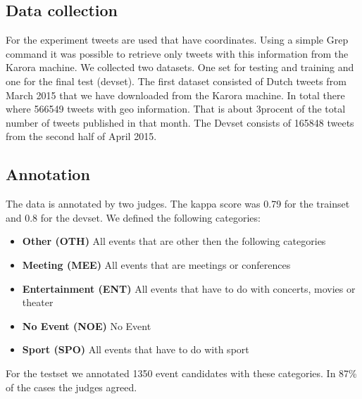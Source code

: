 \documentclass[
10pt, %
a4paper, %
oneside, %
headinclude,footinclude, %
BCOR5mm, %
]{scrartcl}
\begin{document}
\subsection{Data collection}
For the experiment tweets are used that have coordinates. Using a simple Grep command it was possible to retrieve only tweets with this information from the Karora machine. We collected two datasets. One set for testing and training and one for the final test (devset). 
The first dataset consisted of Dutch tweets from March 2015 that we have downloaded from the Karora machine. In total there where 566549 tweets with geo information. That is about 3procent of the total number of tweets published in that month. The Devset consists of 165848 tweets from the second half of April 2015.

\subsection{Annotation}
The data is annotated by two judges. The kappa score was 0.79 for the trainset and 0.8 for the devset. We defined the following categories:

\begin{itemize}[noitemsep] %
\item \textbf{Other (OTH)} All events that are other then the following categories 
\item \textbf{Meeting (MEE)} All events that are meetings or conferences 
\item \textbf{Entertainment (ENT)} All events that have to do with concerts, movies or theater
\item \textbf{No Event (NOE)} No Event
\item \textbf{Sport (SPO)} All events that have to do with sport 
\end{itemize}
For the testset we annotated 1350 event candidates with these categories. In 87\% of the cases the judges agreed.
\end{document}
